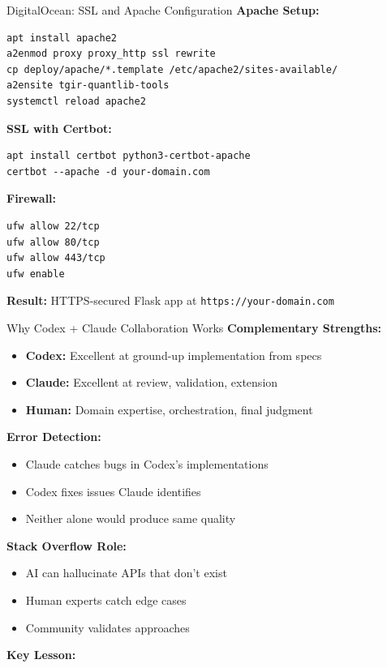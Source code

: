 \documentclass[aspectratio=169,11pt]{beamer}
\begin{document}
\begin{frame}[fragile]{DigitalOcean: SSL and Apache Configuration}
\textbf{Apache Setup:}
\begin{verbatim}
apt install apache2
a2enmod proxy proxy_http ssl rewrite
cp deploy/apache/*.template /etc/apache2/sites-available/
a2ensite tgir-quantlib-tools
systemctl reload apache2
\end{verbatim}

\textbf{SSL with Certbot:}
\begin{verbatim}
apt install certbot python3-certbot-apache
certbot --apache -d your-domain.com
\end{verbatim}

\textbf{Firewall:}
\begin{verbatim}
ufw allow 22/tcp
ufw allow 80/tcp
ufw allow 443/tcp
ufw enable
\end{verbatim}

\textbf{Result:} HTTPS-secured Flask app at \texttt{https://your-domain.com}
\end{frame}

\begin{frame}{Why Codex + Claude Collaboration Works}
\textbf{Complementary Strengths:}
\begin{itemize}
    \item \textbf{Codex:} Excellent at ground-up implementation from specs
    \item \textbf{Claude:} Excellent at review, validation, extension
    \item \textbf{Human:} Domain expertise, orchestration, final judgment
\end{itemize}

\textbf{Error Detection:}
\begin{itemize}
    \item Claude catches bugs in Codex's implementations
    \item Codex fixes issues Claude identifies
    \item Neither alone would produce same quality
\end{itemize}

\textbf{Stack Overflow Role:}
\begin{itemize}
    \item AI can hallucinate APIs that don't exist
    \item Human experts catch edge cases
    \item Community validates approaches
\end{itemize}

\textbf{Key Lesson:}\\[0.2cm]
\end{frame}
\end{document}
